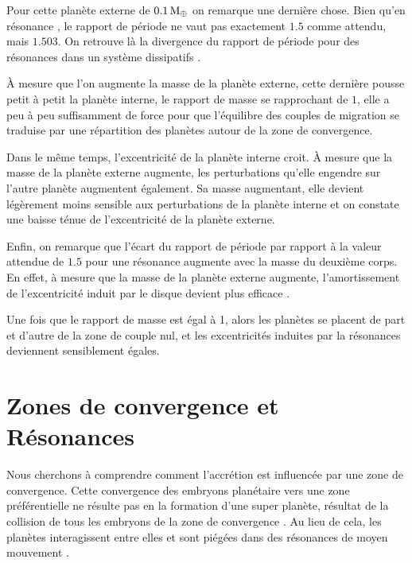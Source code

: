 Pour cette planète externe de $0.1\mathrm{\thinspace M_\oplus}$ on remarque une dernière chose. Bien qu'en résonance , le rapport de période
ne vaut pas exactement $1.5$ comme attendu, mais $1.503$. On retrouve là la divergence du rapport de période pour des
résonances dans un système dissipatifs \citep{batygin2013dissipative}. 

\bigskip

À mesure que l'on augmente la masse de la planète externe, cette dernière pousse petit à petit la planète interne, le rapport
de masse se rapprochant de $1$, elle a peu à peu suffisamment de force pour que l'équilibre des couples de migration se
traduise par une répartition des planètes autour de la zone de convergence. 

Dans le même temps, l'excentricité de la planète interne croit. À mesure que la masse de la planète externe augmente, les
perturbations qu'elle engendre sur l'autre planète augmentent également. Sa masse augmentant, elle devient légèrement moins
sensible aux perturbations de la planète interne et on constate une baisse ténue de l'excentricité de la planète externe. 

Enfin, on remarque que l'écart du rapport de période par rapport à la valeur attendue de $1.5$ pour une résonance 
augmente avec la masse du deuxième corps. En effet, à mesure que la masse de la planète externe augmente, l'amortissement de
l'excentricité induit par le disque devient plus efficace \citep[eq. (9)]{cresswell2008three}. 

\bigskip

Une fois que le rapport de masse est égal à 1, alors les planètes se placent de part et d'autre de la zone de couple nul, et
les excentricités induites par la résonances deviennent sensiblement égales.

\section{Zones de convergence et Résonances}

Nous cherchons à comprendre comment l'accrétion est influencée par une zone de convergence. Cette convergence des embryons
planétaire vers une zone préférentielle ne résulte pas en la formation d'une super planète, résultat de la collision de tous les
embryons de la zone de convergence \citep{morbidelli2008building, sandor2011formation}. Au lieu de cela, les planètes
interagissent entre elles et sont piégées dans des résonances de moyen mouvement . 

